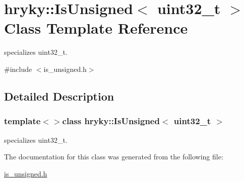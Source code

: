 \hypertarget{classhryky_1_1_is_unsigned_3_01uint32__t_01_4}{\section{hryky\-:\-:Is\-Unsigned$<$ uint32\-\_\-t $>$ Class Template Reference}
\label{classhryky_1_1_is_unsigned_3_01uint32__t_01_4}
}


specializes uint32\-\_\-t.  




{\ttfamily \#include $<$is\-\_\-unsigned.\-h$>$}



\subsection{Detailed Description}
\subsubsection*{template$<$$>$class hryky\-::\-Is\-Unsigned$<$ uint32\-\_\-t $>$}

specializes uint32\-\_\-t. 

The documentation for this class was generated from the following file\-:\begin{DoxyCompactItemize}
\item 
\hyperlink{is__unsigned_8h}{is\-\_\-unsigned.\-h}\end{DoxyCompactItemize}

